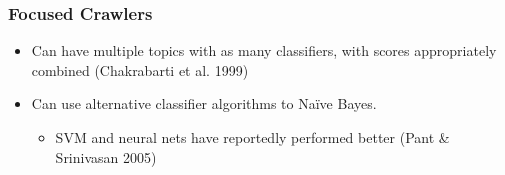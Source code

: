 \documentclass{beamer}
\begin{document}







\begin{frame} \frametitle{Focused Crawlers}

\begin{itemize}
\item Can have multiple topics with as many classifiers, with scores appropriately combined (Chakrabarti et al. 1999)






\item Can use alternative classifier algorithms to Naïve Bayes.
\begin{itemize} 
  \item SVM and neural nets have reportedly performed better (Pant \&
    Srinivasan 2005)
\end{itemize}

\end{itemize}
\end{frame}
\end{document}
